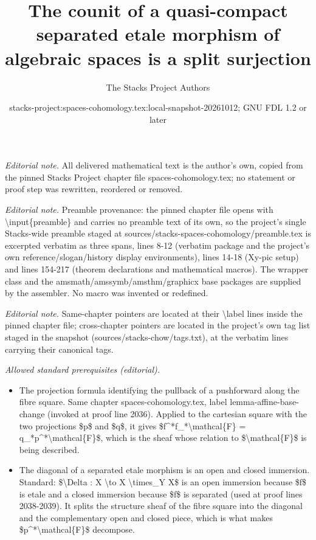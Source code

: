 \documentclass[10pt,a4paper]{amsart}
\title{The counit of a quasi-compact separated etale morphism of algebraic spaces is a split surjection}
\author{The Stacks Project Authors}
\date{stacks-project:spaces-cohomology.tex:local-snapshot-20261012; GNU FDL 1.2 or later}
\theoremstyle{plain}
\theoremstyle{definition}
\theoremstyle{remark}
\numberwithin{equation}{subsection}
\begin{document}
\maketitle
\noindent\textit{Editorial note.} All delivered mathematical text is the author's own, copied from the pinned Stacks Project chapter file spaces-cohomology.tex; no statement or proof step was rewritten, reordered or removed.\par\medskip
\noindent\textit{Editorial note.} Preamble provenance: the pinned chapter file opens with \textbackslash{}input\{preamble\} and carries no preamble text of its own, so the project's single Stacks-wide preamble staged at sources/stacks-spaces-cohomology/preamble.tex is excerpted verbatim as three spans, lines 8-12 (verbatim package and the project's own reference/slogan/history display environments), lines 14-18 (Xy-pic setup) and lines 154-217 (theorem declarations and mathematical macros). The wrapper class and the amsmath/amssymb/amsthm/graphicx base packages are supplied by the assembler. No macro was invented or redefined.\par\medskip
\noindent\textit{Editorial note.} Same-chapter pointers are located at their \textbackslash{}label lines inside the pinned chapter file; cross-chapter pointers are located in the project's own tag list staged in the snapshot (sources/stacks-chow/tags.txt), at the verbatim lines carrying their canonical tags.\par\medskip
\noindent\textit{Allowed standard prerequisites (editorial).}\begin{itemize}
\item The projection formula identifying the pullback of a pushforward along the fibre square. Same chapter spaces-cohomology.tex, label lemma-affine-base-change (invoked at proof line 2036). Applied to the cartesian square with the two projections \$p\$ and \$q\$, it gives \$f\textasciicircum{}*f\_*\textbackslash{}mathcal\{F\} = q\_*p\textasciicircum{}*\textbackslash{}mathcal\{F\}\$, which is the sheaf whose relation to \$\textbackslash{}mathcal\{F\}\$ is being described.
\item The diagonal of a separated etale morphism is an open and closed immersion. Standard: \$\textbackslash{}Delta : X \textbackslash{}to X \textbackslash{}times\_Y X\$ is an open immersion because \$f\$ is etale and a closed immersion because \$f\$ is separated (used at proof lines 2038-2039). It splits the structure sheaf of the fibre square into the diagonal and the complementary open and closed piece, which is what makes \$p\textasciicircum{}*\textbackslash{}mathcal\{F\}\$ decompose.
\end{itemize}\medskip
\end{document}
